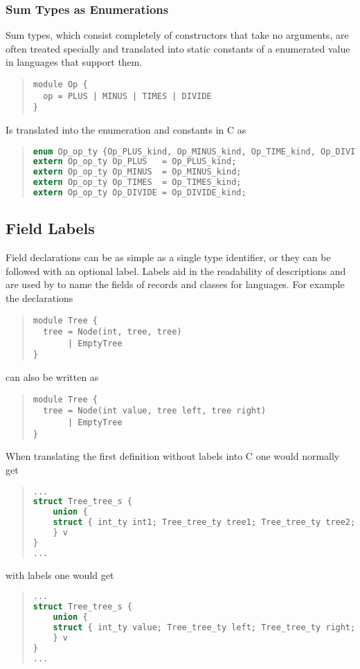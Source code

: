 \subsubsection{Sum Types as Enumerations}
\label{sec:enumerations}

Sum types, which consist completely of constructors that take no arguments,
are often treated specially and translated into static constants of a
enumerated value in languages that support them.
\begin{quote}\begin{lstlisting}[language=ASDL]
module Op {
  op = PLUS | MINUS | TIMES | DIVIDE 
}
\end{lstlisting}\end{quote}%

Is translated into the enumeration and constants in C as
\begin{quote}\begin{lstlisting}[language=c]
enum Op_op_ty {Op_PLUS_kind, Op_MINUS_kind, Op_TIME_kind, Op_DIVIDE_kind};
extern Op_op_ty Op_PLUS   = Op_PLUS_kind;
extern Op_op_ty Op_MINUS  = Op_MINUS_kind;
extern Op_op_ty Op_TIMES  = Op_TIMES_kind;
extern Op_op_ty Op_DIVIDE = Op_DIVIDE_kind;
\end{lstlisting}\end{quote}%

\subsection{Field Labels}
Field declarations can be as simple as a single type identifier, or they can
be followed with an optional label. Labels aid in the readability of
descriptions and are used by \asdlgen{} to name the fields of records
and classes for languages. For example the declarations
\begin{quote}\begin{lstlisting}[language=ASDL]
module Tree {
  tree = Node(int, tree, tree)
       | EmptyTree
}
\end{lstlisting}\end{quote}%
can also be written as
\begin{quote}\begin{lstlisting}[language=ASDL]
module Tree {
  tree = Node(int value, tree left, tree right)
       | EmptyTree
}
\end{lstlisting}\end{quote}%

When translating the first definition without labels 
into C one would normally get
\begin{quote}\begin{lstlisting}[language=c]
...
struct Tree_tree_s {
    union {
    struct { int_ty int1; Tree_tree_ty tree1; Tree_tree_ty tree2; } ...
    } v
}
...
\end{lstlisting}\end{quote}%
with labels one would get
\begin{quote}\begin{lstlisting}[language=c]
...
struct Tree_tree_s {
    union {
    struct { int_ty value; Tree_tree_ty left; Tree_tree_ty right; } ...
    } v
}
...
\end{lstlisting}\end{quote}%

